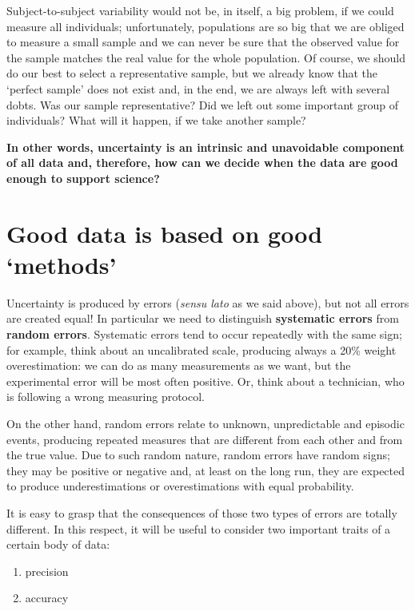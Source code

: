 \documentclass[a4paper,12pt,oneside]{book}
\providecommand{\tightlist}{%
  \setlength{\itemsep}{0pt}\setlength{\parskip}{0pt}}
\begin{document}
Subject-to-subject variability would not be, in itself, a big problem, if we could measure all individuals; unfortunately, populations are so big that we are obliged to measure a small sample and we can never be sure that the observed value for the sample matches the real value for the whole population. Of course, we should do our best to select a representative sample, but we already know that the `perfect sample' does not exist and, in the end, we are always left with several dobts. Was our sample representative? Did we left out some important group of individuals? What will it happen, if we take another sample?

\textbf{In other words, uncertainty is an intrinsic and unavoidable component of all data and, therefore, how can we decide when the data are good enough to support science?}

\hypertarget{good-data-is-based-on-good-methods}{%
\section{Good data is based on good `methods'}\label{good-data-is-based-on-good-methods}}

Uncertainty is produced by errors (\emph{sensu lato} as we said above), but not all errors are created equal! In particular we need to distinguish \textbf{systematic errors} from \textbf{random errors}. Systematic errors tend to occur repeatedly with the same sign; for example, think about an uncalibrated scale, producing always a 20\% weight overestimation: we can do as many measurements as we want, but the experimental error will be most often positive. Or, think about a technician, who is following a wrong measuring protocol.

On the other hand, random errors relate to unknown, unpredictable and episodic events, producing repeated measures that are different from each other and from the true value. Due to such random nature, random errors have random signs; they may be positive or negative and, at least on the long run, they are expected to produce underestimations or overestimations with equal probability.

It is easy to grasp that the consequences of those two types of errors are totally different. In this respect, it will be useful to consider two important traits of a certain body of data:

\begin{enumerate}
\def\labelenumi{\arabic{enumi}.}
\tightlist
\item
  precision
\item
  accuracy
\end{enumerate}
\end{document}
